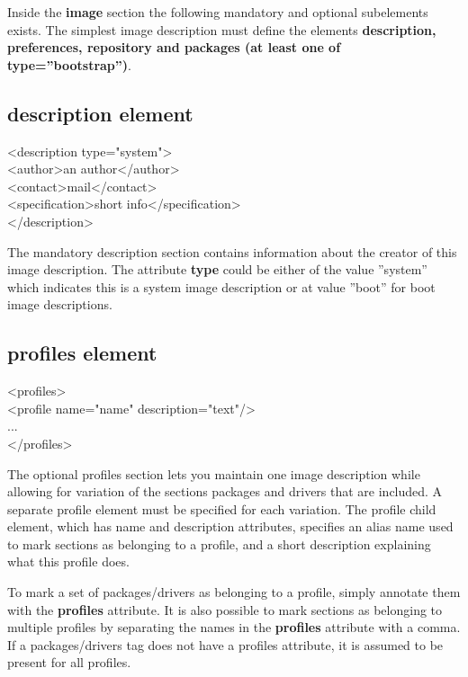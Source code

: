 Inside the \textbf{image} section the following mandatory and optional
subelements exists. The simplest image description must define the
elements \textbf{description, preferences, repository and
packages (at least one of type=''bootstrap'')}.

\subsection{description element}
\begin{Command}{12cm}
<description type="system">\\
\hspace*{1cm}<author>an author</author>\\
\hspace*{1cm}<contact>mail</contact>\\
\hspace*{1cm}<specification>short info</specification>\\
</description>
\end{Command}

The mandatory description section contains information about
the creator of this image description. The attribute \textbf{type}
could be either of the value ''system'' which indicates this is a
system image description or at value ''boot'' for boot image
descriptions.

\subsection{profiles element}
\begin{Command}{12cm}
<profiles>\\
\hspace*{1cm}<profile name="name" description="text"/>\\
\hspace*{1cm}...\\
</profiles>
\end{Command}

The optional profiles section lets you maintain one image description
while allowing for variation of the sections packages and drivers that are
included. A separate profile element must be specified for each variation.
The profile child element, which has name and description attributes,
specifies an alias name used to mark sections as belonging to a profile,
and a short description explaining what this profile does.

To mark a set of packages/drivers as belonging to a profile, simply
annotate them with the \textbf{profiles} attribute. It is also possible
to mark sections as belonging to multiple profiles by separating the
names in the \textbf{profiles} attribute with a comma.
If a packages/drivers tag does not have a profiles attribute, it is
assumed to be present for all profiles.

